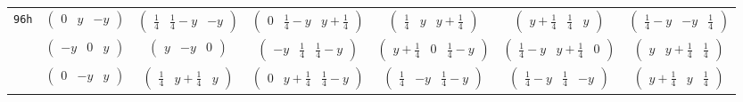 \documentclass[fleqn,9pt,landscape]{jsarticle}
\begin{document}
\begin{center}
\begin{longtable}{ccccccc}
{\tt 96h} & $ \begin{pmatrix} 0 & y & - y \end{pmatrix} $ & $ \begin{pmatrix} \frac{1}{4} & \frac{1}{4} - y & - y \end{pmatrix} $ & $ \begin{pmatrix} 0 & \frac{1}{4} - y & y + \frac{1}{4} \end{pmatrix} $ & $ \begin{pmatrix} \frac{1}{4} & y & y + \frac{1}{4} \end{pmatrix} $ & $ \begin{pmatrix} y + \frac{1}{4} & \frac{1}{4} & y \end{pmatrix} $ & $ \begin{pmatrix} \frac{1}{4} - y & - y & \frac{1}{4} \end{pmatrix} $ \\
& $ \begin{pmatrix} - y & 0 & y \end{pmatrix} $ & $ \begin{pmatrix} y & - y & 0 \end{pmatrix} $ & $ \begin{pmatrix} - y & \frac{1}{4} & \frac{1}{4} - y \end{pmatrix} $ & $ \begin{pmatrix} y + \frac{1}{4} & 0 & \frac{1}{4} - y \end{pmatrix} $ & $ \begin{pmatrix} \frac{1}{4} - y & y + \frac{1}{4} & 0 \end{pmatrix} $ & $ \begin{pmatrix} y & y + \frac{1}{4} & \frac{1}{4} \end{pmatrix} $ \\
& $ \begin{pmatrix} 0 & - y & y \end{pmatrix} $ & $ \begin{pmatrix} \frac{1}{4} & y + \frac{1}{4} & y \end{pmatrix} $ & $ \begin{pmatrix} 0 & y + \frac{1}{4} & \frac{1}{4} - y \end{pmatrix} $ & $ \begin{pmatrix} \frac{1}{4} & - y & \frac{1}{4} - y \end{pmatrix} $ & $ \begin{pmatrix} \frac{1}{4} - y & \frac{1}{4} & - y \end{pmatrix} $ & $ \begin{pmatrix} y + \frac{1}{4} & y & \frac{1}{4} \end{pmatrix} $ \\

\end{longtable}
\end{center}
\end{document}
